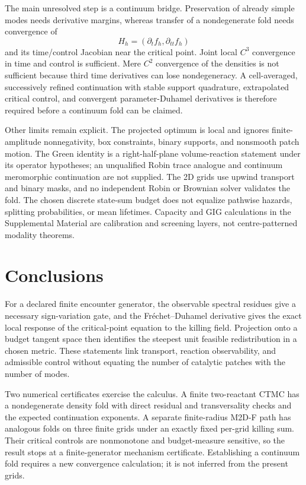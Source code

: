 \documentclass[aps,pre,reprint,amsmath,amssymb,longbibliography,floatfix]{revtex4-2}
\begin{document}
The main unresolved step is a continuum bridge. Preservation of already
simple modes needs derivative margins, whereas transfer of a nondegenerate
fold needs convergence of
\[
H_h=(\partial_t f_h,\partial_{tt}f_h)
\]
and its time/control Jacobian near the critical point. Joint local \(C^3\)
convergence in time and control is sufficient. Mere \(C^2\) convergence of
the densities is not sufficient because third time derivatives can lose
nondegeneracy. A cell-averaged, successively refined continuation with stable
support quadrature, extrapolated critical control, and convergent
parameter-Duhamel derivatives is therefore required before a continuum fold
can be claimed.

Other limits remain explicit. The projected optimum is local and ignores
finite-amplitude nonnegativity, box constraints, binary supports, and
nonsmooth patch motion. The Green identity is a right-half-plane
volume-reaction statement under its operator hypotheses; an unqualified
Robin trace analogue and continuum meromorphic continuation are not supplied.
The 2D grids use upwind transport and binary masks, and no independent Robin
or Brownian solver validates the fold. The chosen discrete state-sum budget
does not equalize pathwise hazards, splitting probabilities, or mean
lifetimes. Capacity and GIG calculations in the Supplemental Material are
calibration and screening layers, not centre-patterned modality theorems.

\section{Conclusions}
\label{sec:conclusions}

For a declared finite encounter generator, the observable spectral residues
give a necessary sign-variation gate, and the Fr\'echet--Duhamel derivative
gives the exact local response of the critical-point equation to the killing
field. Projection onto a budget tangent space then identifies the steepest
unit feasible redistribution in a chosen metric. These statements link
transport, reaction observability, and admissible control without equating
the number of catalytic patches with the number of modes.

Two numerical certificates exercise the calculus. A finite two-reactant CTMC
has a nondegenerate density fold with direct residual and transversality
checks and the expected continuation exponents. A separate finite-radius M2D-F
path has analogous folds on three finite grids under an exactly fixed
per-grid killing sum. Their critical controls are nonmonotone and
budget-measure sensitive, so the result stops at a finite-generator mechanism
certificate. Establishing a continuum fold requires a new convergence
calculation; it is not inferred from the present grids.
\end{document}
